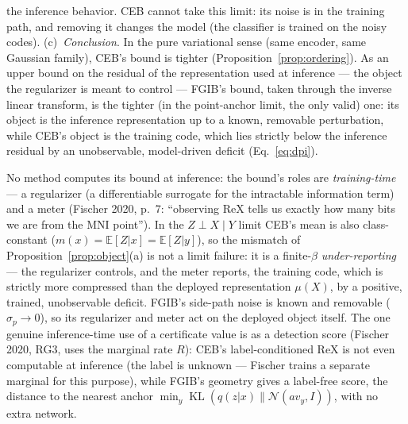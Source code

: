 \begin{proposition}
the inference behavior. CEB cannot take this limit: its noise is in the training path,
and removing it changes the model (the classifier is trained on the noisy codes).
(c)~\emph{Conclusion}. In the pure variational sense (same encoder, same Gaussian
family), CEB's bound is tighter (Proposition~\ref{prop:ordering}). As an upper bound on
the residual of the representation used at inference --- the object the regularizer is
meant to control --- FGIB's bound, taken through the inverse linear transform, is the
tighter (in the point-anchor limit, the only valid) one: its object is the inference
representation up to a known, removable perturbation, while CEB's object is the training
code, which lies strictly below the inference residual by an unobservable, model-driven
deficit (Eq.~\eqref{eq:dpi}).
\end{proposition}

\begin{remark}\label{rem:training-role}
No method computes its bound at inference: the bound's roles are \emph{training-time}
--- a regularizer (a differentiable surrogate for the intractable information term) and
a meter (Fischer 2020, p.~7: ``observing ReX tells us exactly how many bits we are from
the MNI point''). In the $Z \perp X \mid Y$ limit CEB's mean is also class-constant
($m(x) = \mathbb{E}[Z|x] = \mathbb{E}[Z|y]$), so the mismatch of
Proposition~\ref{prop:object}(a) is not a limit failure: it is a finite-$\beta$
\emph{under-reporting} --- the regularizer controls, and the meter reports, the training
code, which is strictly more compressed than the deployed representation $\mu(X)$, by a
positive, trained, unobservable deficit. FGIB's side-path noise is known and removable
($\sigma_p \to 0$), so its regularizer and meter act on the deployed object itself.
The one genuine inference-time use of a certificate value is as a detection score
(Fischer 2020, RG3, uses the marginal rate $R$): CEB's label-conditioned
$\mathrm{ReX}$ is not even computable at inference (the label is unknown --- Fischer
trains a separate marginal for this purpose), while FGIB's geometry gives a label-free
score, the distance to the nearest anchor
$\min_y \operatorname{KL}(q(z|x)\|\mathcal{N}(a v_y, I))$, with no extra network.
\end{remark}


